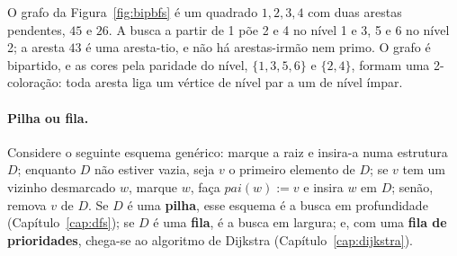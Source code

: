 \begin{exemplo}\label{ex:bfsbip}
O grafo da Figura~\ref{fig:bipbfs} é um quadrado $1,2,3,4$ com duas arestas pendentes, $45$ e $26$. A busca a partir de 1 põe 2 e 4 no nível 1 e 3, 5 e 6 no nível 2; a aresta $43$ é uma aresta-tio, e não há arestas-irmão nem primo. O grafo é bipartido, e as cores pela paridade do nível, $\{1,3,5,6\}$ e $\{2,4\}$, formam uma 2-coloração: toda aresta liga um vértice de nível par a um de nível ímpar.
\begin{figura}
\end{figura}
\end{exemplo}

\paragraph{Pilha ou fila.} Considere o seguinte esquema genérico: marque a raiz e insira-a numa estrutura $D$; enquanto $D$ não estiver vazia, seja $v$ o primeiro elemento de $D$; se $v$ tem um vizinho desmarcado $w$, marque $w$, faça $pai(w):=v$ e insira $w$ em $D$; senão, remova $v$ de $D$. Se $D$ é uma \textbf{pilha}, esse esquema é a busca em profundidade (Capítulo~\ref{cap:dfs}); se $D$ é uma \textbf{fila}, é a busca em largura; e, com uma \textbf{fila de prioridades}, chega-se ao algoritmo de Dijkstra (Capítulo~\ref{cap:dijkstra}).

